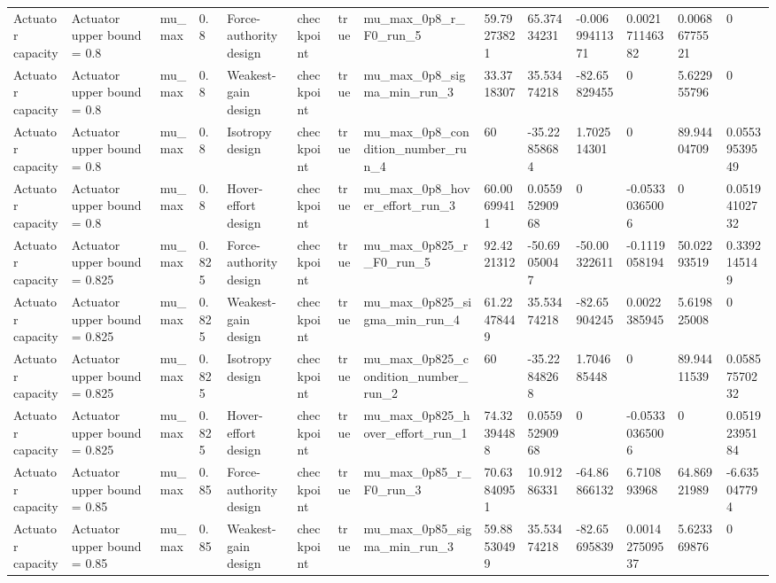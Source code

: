 \begin{tabular}{@{}llllllllllllll@{}}
Actuator capacity & Actuator upper bound = 0.8 & mu\_max & 0.8 & Force-authority design & checkpoint & true & mu\_max\_0p8\_r\_F0\_run\_5 & 59.79273821 & 65.37434231 & -0.00699411371 & 0.002171146382 & 0.00686775521 & 0 \\
Actuator capacity & Actuator upper bound = 0.8 & mu\_max & 0.8 & Weakest-gain design & checkpoint & true & mu\_max\_0p8\_sigma\_min\_run\_3 & 33.3718307 & 35.53474218 & -82.65829455 & 0 & 5.622955796 & 0 \\
Actuator capacity & Actuator upper bound = 0.8 & mu\_max & 0.8 & Isotropy design & checkpoint & true & mu\_max\_0p8\_condition\_number\_run\_4 & 60 & -35.22858684 & 1.702514301 & 0 & 89.94404709 & 0.05539539549 \\
Actuator capacity & Actuator upper bound = 0.8 & mu\_max & 0.8 & Hover-effort design & checkpoint & true & mu\_max\_0p8\_hover\_effort\_run\_3 & 60.00699411 & 0.05595290968 & 0 & -0.05330365006 & 0 & 0.05194102732 \\
Actuator capacity & Actuator upper bound = 0.825 & mu\_max & 0.825 & Force-authority design & checkpoint & true & mu\_max\_0p825\_r\_F0\_run\_5 & 92.4221312 & -50.69050047 & -50.00322611 & -0.1119058194 & 50.02293519 & 0.3392145149 \\
Actuator capacity & Actuator upper bound = 0.825 & mu\_max & 0.825 & Weakest-gain design & checkpoint & true & mu\_max\_0p825\_sigma\_min\_run\_4 & 61.22478449 & 35.53474218 & -82.65904245 & 0.0022385945 & 5.619825008 & 0 \\
Actuator capacity & Actuator upper bound = 0.825 & mu\_max & 0.825 & Isotropy design & checkpoint & true & mu\_max\_0p825\_condition\_number\_run\_2 & 60 & -35.22848268 & 1.704685448 & 0 & 89.94411539 & 0.05857570232 \\
Actuator capacity & Actuator upper bound = 0.825 & mu\_max & 0.825 & Hover-effort design & checkpoint & true & mu\_max\_0p825\_hover\_effort\_run\_1 & 74.32394488 & 0.05595290968 & 0 & -0.05330365006 & 0 & 0.05192395184 \\
Actuator capacity & Actuator upper bound = 0.85 & mu\_max & 0.85 & Force-authority design & checkpoint & true & mu\_max\_0p85\_r\_F0\_run\_3 & 70.63840951 & 10.91286331 & -64.86866132 & 6.710893968 & 64.86921989 & -6.635047794 \\
Actuator capacity & Actuator upper bound = 0.85 & mu\_max & 0.85 & Weakest-gain design & checkpoint & true & mu\_max\_0p85\_sigma\_min\_run\_3 & 59.88530499 & 35.53474218 & -82.65695839 & 0.001427509537 & 5.623369876 & 0 \\

\end{tabular}
